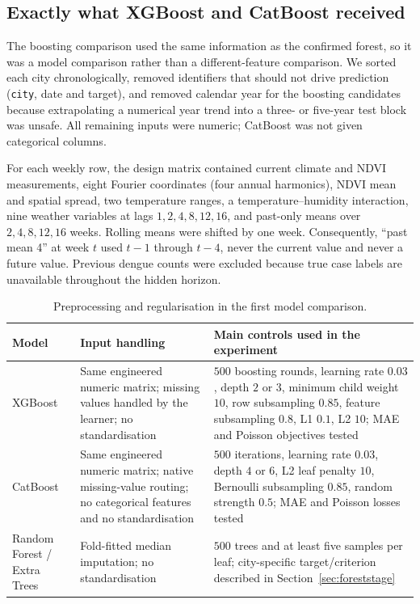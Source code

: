 \documentclass[11pt,a4paper]{article}
\begin{document}
\subsection{Exactly what XGBoost and CatBoost received}
The boosting comparison used the same information as the confirmed forest, so it was a model comparison rather than a different-feature comparison. We sorted each city chronologically, removed identifiers that should not drive prediction (\texttt{city}, date and target), and removed calendar year for the boosting candidates because extrapolating a numerical year trend into a three- or five-year test block was unsafe. All remaining inputs were numeric; CatBoost was not given categorical columns.

For each weekly row, the design matrix contained current climate and NDVI measurements, eight Fourier coordinates (four annual harmonics), NDVI mean and spatial spread, two temperature ranges, a temperature--humidity interaction, nine weather variables at lags $1,2,4,8,12,16$, and past-only means over $2,4,8,12,16$ weeks. Rolling means were shifted by one week. Consequently, ``past mean 4'' at week $t$ used $t-1$ through $t-4$, never the current value and never a future value. Previous dengue counts were excluded because true case labels are unavailable throughout the hidden horizon.

\begin{table}[H]
\centering
\caption{Preprocessing and regularisation in the first model comparison.}
\label{tab:boostprep}
\small
\begin{tabular}{>{\raggedright\arraybackslash}p{2.5cm}>{\raggedright\arraybackslash}p{4.8cm}>{\raggedright\arraybackslash}p{6.5cm}}
\toprule
\textbf{Model} & \textbf{Input handling} & \textbf{Main controls used in the experiment}\\
\midrule
XGBoost & Same engineered numeric matrix; missing values handled by the learner; no standardisation & $500$ boosting rounds, learning rate $0.03$, depth $2$ or $3$, minimum child weight $10$, row subsampling $0.85$, feature subsampling $0.8$, L1 $0.1$, L2 $10$; MAE and Poisson objectives tested\\
CatBoost & Same engineered numeric matrix; native missing-value routing; no categorical features and no standardisation & $500$ iterations, learning rate $0.03$, depth $4$ or $6$, L2 leaf penalty $10$, Bernoulli subsampling $0.85$, random strength $0.5$; MAE and Poisson losses tested\\
Random Forest / Extra Trees & Fold-fitted median imputation; no standardisation & $500$ trees and at least five samples per leaf; city-specific target/criterion described in Section~\ref{sec:foreststage}\\
\bottomrule
\end{tabular}
\end{table}
\end{document}

